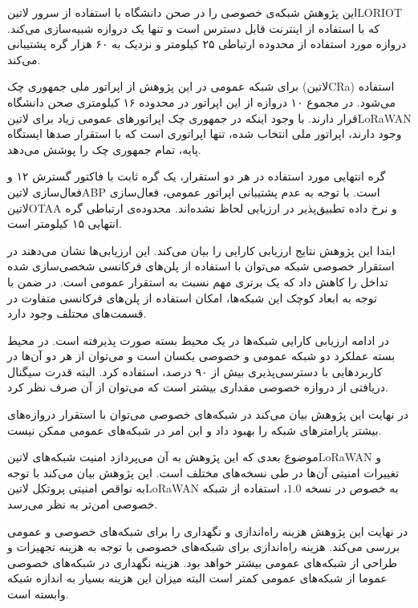 این پژوهش شبکه‌ی خصوصی را در صحن دانشگاه با استفاده از سرور ‌لاتین{LORIOT} که با استفاده از اینترنت قابل دسترس است و تنها یک دروازه شبیه‌سازی می‌کند.
دروازه مورد استفاده از محدوده ارتباطی ۲۵ کیلومتر و نزدیک به ۶۰ هزار گره پشتیبانی می‌کند.

برای شبکه عمومی در این پژوهش از اپراتور ملی جمهوری چک (‌لاتین{CRa}) استفاده می‌شود.
در مجموع ۱۰ دروازه از این اپراتور در محدوده ۱۶ کیلومتری صحن دانشگاه قرار دارند.
با وجود اینکه در جمهوری چک اپراتورهای عمومی زیاد برای ‌لاتین{LoRaWAN} وجود دارند، اپراتور ملی انتخاب شده،
تنها اپراتوری است که با استقرار صدها ایستگاه پایه، تمام جمهوری چک را پوشش می‌دهد.

گره انتهایی مورد استفاده در هر دو استقرار، یک گره ثابت با فاکتور گسترش ۱۲ و فعال‌سازی ‌لاتین{ABP} است.
با توجه به عدم پشتیبانی اپراتور عمومی، فعال‌سازی ‌لاتین{OTAA} و نرخ داده تطبیق‌پذیر در ارزیابی لحاظ نشده‌اند.
محدوده‌ی ارتباطی گره انتهایی ۱۵ کیلومتر است.

ابتدا این پژوهش نتایج ارزیابی کارایی را بیان می‌کند. این ارزیابی‌ها نشان می‌دهند در استقرار خصوصی شبکه می‌توان
با استفاده از پلن‌های فرکانسی شخصی‌سازی شده تداخل را کاهش داد که یک برتری مهم نسبت به استقرار عمومی است.
در ضمن با توجه به ابعاد کوچک این شبکه‌ها، امکان استفاده از پلن‌های فرکانسی متفاوت در قسمت‌های محتلف وجود دارد.

در ادامه ارزیابی کارایی شبکه‌ها در یک محیط بسته صورت پذیرفته است.
در محیط بسته عملکرد دو شبکه عمومی و خصوصی یکسان است و می‌توان از هر دو آن‌ها
در کاربردهایی با دسترسی‌پذیری بیش از ۹۰ درصد،
استفاده کرد. البته قدرت سیگنال
دریافتی از دروازه خصوصی مقداری بیشتر است که می‌توان از آن صرف نظر کرد.

در نهایت این پژوهش بیان می‌کند در شبکه‌های خصوصی می‌توان با استقرار دروازه‌های بیشتر پارامترهای
شبکه را بهبود داد و این امر در شبکه‌های عمومی ممکن نیست.

موضوع بعدی که این پژوهش به آن می‌پردازد امنیت شبکه‌های ‌لاتین{LoRaWAN} و تغییرات امنیتی آن‌ها در طی نسخه‌های مختلف است.
این پژوهش بیان می‌کند با توجه به نواقص امنیتی پروتکل ‌لاتین{LoRaWAN} به خصوص در نسخه $1.0$، استفاده از شبکه خصوصی امن‌تر
به نظر می‌رسد.

در نهایت این پژوهش هزینه راه‌اندازی و نگهداری را برای شبکه‌های خصوصی و عمومی بررسی می‌کند.
هزینه راه‌اندازی برای شبکه‌های خصوصی با توجه به هزینه تجهیزات و طراحی از شبکه‌های عمومی بیشتر خواهد بود.
هزینه نگهداری در شبکه‌های خصوصی عموما از شبکه‌های عمومی کمتر است البته میزان این هزینه بسیار به اندازه شبکه وابسته است.


